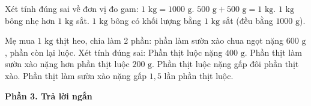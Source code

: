 \begin{ex} %
Xét tính đúng sai về đơn vị đo gam:
\choiceTF
{\True $1\text{ kg} = 1000\text{ g}$.}
{\True $500\text{ g} + 500\text{ g} = 1\text{ kg}$.}
{$1\text{ kg}$ bông nhẹ hơn $1\text{ kg}$ sắt.}
{\True $1\text{ kg}$ bông có khối lượng bằng $1\text{ kg}$ sắt (đều bằng $1000\text{ g}$).}
\end{ex}

\begin{ex} %
Mẹ mua $1\text{ kg}$ thịt heo, chia làm 2 phần: phần làm sườn xào chua ngọt nặng $600\text{ g}$, phần còn lại luộc. Xét tính đúng sai:
\choiceTF
{\True Phần thịt luộc nặng $400\text{ g}$.}
{\True Phần thịt làm sườn xào nặng hơn phần thịt luộc $200\text{ g}$.}
{Phần thịt luộc nặng gấp đôi phần thịt xào.}
{\True Phần thịt làm sườn xào nặng gấp $1{,}5$ lần phần thịt luộc.}
\end{ex}

\textbf{Phần 3. Trả lời ngắn}

